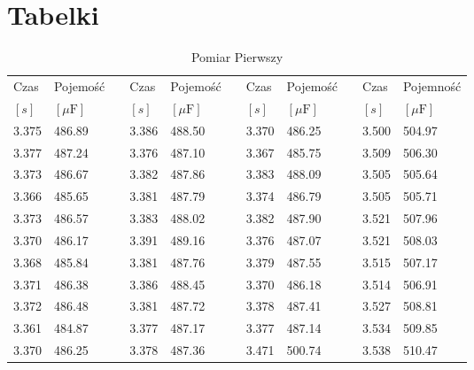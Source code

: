 \documentclass[12pt]{mwrep}
\begin{document}
	\section{Tabelki}%
	\begin{table}[H]\caption{Pomiar Pierwszy}\label{tab:1}
		\begin{tabularx}{\textwidth}{|Y|Z{16mm}|p{2mm}|Y|Z{16mm}|p{2mm}|Y|Z{16mm}|p{2mm}|Y|Z{16mm}|}
			Czas & Pojemość && Czas & Pojemość && Czas & Pojemość && Czas & Pojemność \\
			$[s]$ & $[\mu\text{F}]$ && $[s]$ & $[\mu\text{F}]$ && $[s]$ & $[\mu\text{F}]$ && $[s]$ & $[\mu\text{F}]$ \\
			3.375 & 486.89 && 3.386 & 488.50 && 3.370 & 486.25 && 3.500 & 504.97 \\
			3.377 & 487.24 && 3.376 & 487.10 && 3.367 & 485.75 && 3.509 & 506.30 \\
			3.373 & 486.67 && 3.382 & 487.86 && 3.383 & 488.09 && 3.505 & 505.64 \\
			3.366 & 485.65 && 3.381 & 487.79 && 3.374 & 486.79 && 3.505 & 505.71 \\
			3.373 & 486.57 && 3.383 & 488.02 && 3.382 & 487.90 && 3.521 & 507.96 \\
			3.370 & 486.17 && 3.391 & 489.16 && 3.376 & 487.07 && 3.521 & 508.03 \\
			3.368 & 485.84 && 3.381 & 487.76 && 3.379 & 487.55 && 3.515 & 507.17 \\
			3.371 & 486.38 && 3.386 & 488.45 && 3.370 & 486.18 && 3.514 & 506.91 \\
			3.372 & 486.48 && 3.381 & 487.72 && 3.378 & 487.41 && 3.527 & 508.81 \\
			3.361 & 484.87 && 3.377 & 487.17 && 3.377 & 487.14 && 3.534 & 509.85 \\
			3.370 & 486.25 && 3.378 & 487.36 && 3.471 & 500.74 && 3.538 & 510.47 \\

\end{tabularx}
\end{table}
\end{document}
